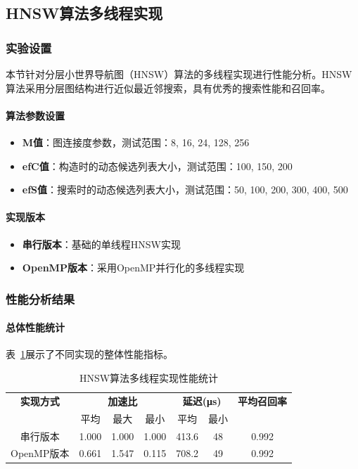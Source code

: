 \subsection{HNSW算法多线程实现}

\subsubsection{实验设置}

本节针对分层小世界导航图（HNSW）算法的多线程实现进行性能分析。HNSW算法采用分层图结构进行近似最近邻搜索，具有优秀的搜索性能和召回率。

\paragraph{算法参数设置}
\begin{itemize}
    \item \textbf{M值}：图连接度参数，测试范围：8, 16, 24, 128, 256
    \item \textbf{efC值}：构造时的动态候选列表大小，测试范围：100, 150, 200
    \item \textbf{efS值}：搜索时的动态候选列表大小，测试范围：50, 100, 200, 300, 400, 500
\end{itemize}

\paragraph{实现版本}
\begin{itemize}
    \item \textbf{串行版本}：基础的单线程HNSW实现
    \item \textbf{OpenMP版本}：采用OpenMP并行化的多线程实现
\end{itemize}

\subsubsection{性能分析结果}

\paragraph{总体性能统计}

表~\ref{tab:hnsw_performance_stats}展示了不同实现的整体性能指标。

\begin{table}[htbp]
\centering
\caption{HNSW算法多线程实现性能统计}
\label{tab:hnsw_performance_stats}
\begin{tabular}{|c|c|c|c|c|c|c|}
\hline
\textbf{实现方式} & \multicolumn{3}{c|}{\textbf{加速比}} & \multicolumn{2}{c|}{\textbf{延迟(μs)}} & \textbf{平均召回率} \\
\cline{2-6}
 & 平均 & 最大 & 最小 & 平均 & 最小 & \\
\hline
串行版本 & 1.000 & 1.000 & 1.000 & 413.6 & 48 & 0.992 \\
OpenMP版本 & 0.661 & 1.547 & 0.115 & 708.2 & 49 & 0.992 \\
\hline
\end{tabular}
\end{table}

